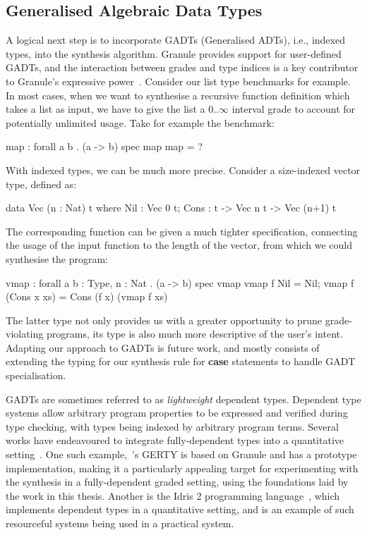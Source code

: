 \subsection{Generalised Algebraic Data Types}
A logical next step is to incorporate GADTs (Generalised ADTs), i.e., indexed
types,  into the synthesis algorithm. Granule provides support for user-defined
GADTs, and the interaction between grades and type indices is a key contributor
to Granule's expressive power~\citep{DBLP:journals/pacmpl/OrchardLE19}. Consider
our list type benchmarks for example. In most cases, when we want to synthesise
a recursive function definition which takes a list as input, we have to give the
list a $0..\infty$ interval grade to account for potentially unlimited usage.
Take for example the  benchmark:
\begin{granule}
map : forall a b . (a -> b) %
spec
    map %
map = ?
\end{granule}
With indexed types, we can be much more precise. Consider a size-indexed vector type,
defined as:
\begin{granule}
data Vec (n : Nat) t where
  Nil  : Vec 0 t;
  Cons : t -> Vec n t -> Vec (n+1) t
\end{granule}
%
The corresponding  function
can be given a much tighter specification, connecting the usage of the
input function to the length of the vector, from which we could
synthesise the program:
\begin{granule}
vmap : forall {a b : Type, n : Nat} . (a -> b) %
spec
    vmap %
vmap f Nil = Nil;
vmap f (Cons x xs) = Cons (f x) (vmap f xs)
\end{granule}
The latter type not only provides us with a greater opportunity to prune
grade-violating programs, its type is also much more descriptive of the user's
intent. Adapting our approach to GADTs is future work, and mostly consists of
extending the typing for our synthesis rule for \textbf{case} statements to
handle GADT specialisation.

GADTs are sometimes referred to as \emph{lightweight} dependent types. Dependent
type systems allow arbitrary program properties to be expressed and verified
during type checking, with types being indexed by arbitrary program terms.
Several works have endeavoured to integrate fully-dependent types into a
quantitative setting~\citep{DBLP:journals/pacmpl/ChoudhuryEEW21,
10.1145/3607862, McBride2016, 10.1145/2676726.2676969}. One such
example,~\citet{DBLP:conf/esop/MoonEO21}'s \textsc{GERTY} is based on Granule
and has a prototype implementation, making it a particularly appealing target
for experimenting with the synthesis in a fully-dependent graded setting, using
the foundations laid by the work in this thesis. Another is the Idris 2
programming language~\citep{DBLP:journals/corr/abs-2104-00480}, which implements
dependent types in a quantitative setting, and is an example of such resourceful
systems being used in a practical system.

